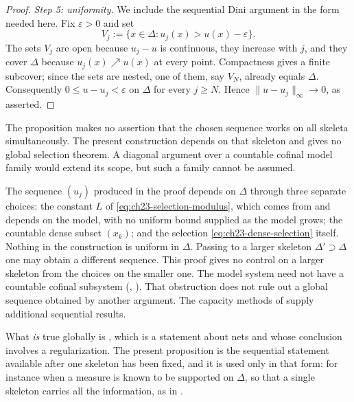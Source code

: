 \begin{proof}
\emph{Step 5: uniformity.}
We include the sequential Dini argument in the form needed here.  Fix
$\varepsilon>0$ and set
\[
 V_j:=\{x\in\Delta:u_j(x)>u(x)-\varepsilon\}.
\]
The sets $V_j$ are open because $u_j-u$ is continuous, they increase
with $j$, and they cover $\Delta$ because $u_j(x)\nearrow u(x)$ at
every point.  Compactness gives a finite subcover; since the sets are nested,
one of them, say $V_N$, already equals $\Delta$.  Consequently
$0\leq u-u_j<\varepsilon$ on $\Delta$ for every $j\geq N$.  Hence
$\|u-u_j\|_\infty\to0$, as asserted.
\end{proof}

\begin{remark}
\label{rem:ch23-selection-scope}
The proposition makes no assertion that the chosen sequence works on all
skeleta simultaneously.  The present construction depends on that skeleton and gives no global
selection theorem.  A diagonal argument over a countable cofinal model
family would extend its scope, but such a family cannot be assumed.

The sequence $(u_j)$ produced in the proof depends on $\Delta$ through
three separate choices: the constant $L$ of
\eqref{eq:ch23-selection-modulus}, which comes from
 and depends on the model, with no
uniform bound supplied as the model grows; the
countable dense subset $(x_k)$; and the selection
\eqref{eq:ch23-dense-selection} itself.  Nothing in the construction is
uniform in $\Delta$.  Passing to a larger skeleton $\Delta'\supset\Delta$
one may obtain a different sequence.  This proof gives no control on a
larger skeleton from the choices on the smaller one.  The model system
need not have a countable cofinal subsystem
(, ).
That obstruction does not rule out a global sequence obtained by another
argument.  The capacity methods of  supply
additional sequential results.

What \emph{is} true globally is , which is a
statement about nets and whose conclusion involves a regularization.  The
present proposition is the sequential statement available after one skeleton
has been fixed, and it is used only in that form: for instance when a measure
is known to be supported on $\Delta$, so that a single skeleton carries all
the information, as in .
\end{remark}


